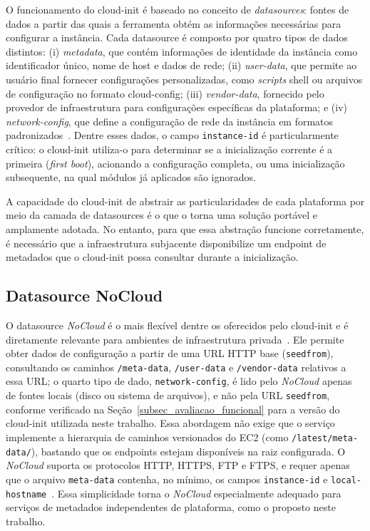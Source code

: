 O funcionamento do cloud-init é baseado no conceito de \textit{datasources}: fontes de dados a partir das quais a ferramenta obtém as informações necessárias para configurar a instância. Cada datasource é composto por quatro tipos de dados distintos: (i) \textit{metadata}, que contém informações de identidade da instância como identificador único, nome de host e dados de rede; (ii) \textit{user-data}, que permite ao usuário final fornecer configurações personalizadas, como \textit{scripts} shell ou arquivos de configuração no formato cloud-config; (iii) \textit{vendor-data}, fornecido pelo provedor de infraestrutura para configurações específicas da plataforma; e (iv) \textit{network-config}, que define a configuração de rede da instância em formatos padronizados~\citep{cloudinit2024}. Dentre esses dados, o campo \texttt{instance-id} é particularmente crítico: o cloud-init utiliza-o para determinar se a inicialização corrente é a primeira (\textit{first boot}), acionando a configuração completa, ou uma inicialização subsequente, na qual módulos já aplicados são ignorados.

A capacidade do cloud-init de abstrair as particularidades de cada plataforma por meio da camada de datasources é o que o torna uma solução portável e amplamente adotada. No entanto, para que essa abstração funcione corretamente, é necessário que a infraestrutura subjacente disponibilize um endpoint de metadados que o cloud-init possa consultar durante a inicialização.

\subsection{Datasource NoCloud}

O datasource \textit{NoCloud} é o mais flexível dentre os oferecidos pelo cloud-init e é diretamente relevante para ambientes de infraestrutura privada~\citep{cloudinit_nocloud}. Ele permite obter dados de configuração a partir de uma URL HTTP base (\texttt{seedfrom}), consultando os caminhos \texttt{/meta-data}, \texttt{/user-data} e \texttt{/vendor-data} relativos a essa URL; o quarto tipo de dado, \texttt{network-config}, é lido pelo \textit{NoCloud} apenas de fontes locais (disco ou sistema de arquivos), e não pela URL \texttt{seedfrom}, conforme verificado na Seção~\ref{subsec_avaliacao_funcional} para a versão do cloud-init utilizada neste trabalho. Essa abordagem não exige que o serviço implemente a hierarquia de caminhos versionados do EC2 (como \texttt{/latest/meta-data/}), bastando que os endpoints estejam disponíveis na raiz configurada. O \textit{NoCloud} suporta os protocolos HTTP, HTTPS, FTP e FTPS, e requer apenas que o arquivo \texttt{meta-data} contenha, no mínimo, os campos \texttt{instance-id} e \texttt{local-hostname}~\citep{cloudinit_nocloud}. Essa simplicidade torna o \textit{NoCloud} especialmente adequado para serviços de metadados independentes de plataforma, como o proposto neste trabalho.

